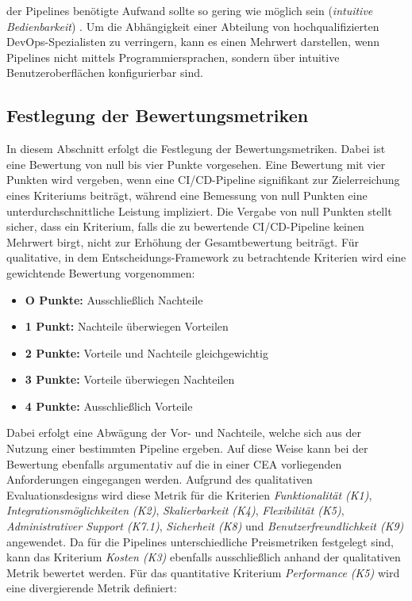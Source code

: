 der Pipelines benötigte Aufwand sollte so gering wie möglich sein (\textit{intuitive Bedienbarkeit}) \cite[Z. 67 ff.]{ProductOwnerSAPBTPProd&Infra.}. Um die Abhängigkeit einer Abteilung von hochqualifizierten DevOps-Spezialisten zu verringern, kann es
einen Mehrwert darstellen, wenn Pipelines nicht mittels Programmiersprachen, sondern über intuitive Benutzeroberflächen konfigurierbar sind. 
\subsection{Festlegung der Bewertungsmetriken}
\label{sec:Metriken}
In diesem Abschnitt erfolgt die Festlegung der Bewertungsmetriken. Dabei ist eine Bewertung von null bis vier Punkte vorgesehen. Eine Bewertung mit vier Punkten wird vergeben, wenn eine CI/CD-Pipeline signifikant zur Zielerreichung eines Kriteriums beiträgt, während eine Bemessung von null Punkten eine unterdurchschnittliche Leistung impliziert. Die Vergabe von null Punkten stellt sicher, dass ein Kriterium, falls die zu bewertende CI/CD-Pipeline keinen Mehrwert birgt, nicht zur Erhöhung der Gesamtbewertung beiträgt. 
Für qualitative, in dem Entscheidungs-Framework zu betrachtende Kriterien wird eine gewichtende Bewertung vorgenommen:
\begin{itemize}
	\setlength{\itemsep}{0pt}
	\item \textbf{O Punkte:} Ausschließlich Nachteile 
	\item \textbf{1 Punkt:} Nachteile überwiegen Vorteilen
	\item \textbf{2 Punkte:} Vorteile und Nachteile gleichgewichtig
	\item \textbf{3 Punkte:} Vorteile überwiegen Nachteilen
	\item \textbf{4 Punkte:} Ausschließlich Vorteile
  \end{itemize}
Dabei erfolgt eine Abwägung der Vor- und Nachteile, welche sich aus der Nutzung einer bestimmten Pipeline ergeben. Auf diese Weise kann bei der Bewertung ebenfalls argumentativ auf die in einer CEA vorliegenden Anforderungen eingegangen werden. Aufgrund des qualitativen Evaluationsdesigns wird diese Metrik für die Kriterien \textit{Funktionalität (K1)}, \textit{Integrationsmöglichkeiten (K2)}, \textit{Skalierbarkeit (K4)}, \textit{Flexibilität (K5)}, \textit{Administrativer Support (K7.1)}, \textit{Sicherheit (K8)} und \textit{Benutzerfreundlichkeit (K9)} angewendet. Da für die Pipelines unterschiedliche  Preismetriken festgelegt sind, kann das Kriterium \textit{Kosten (K3)} ebenfalls ausschließlich anhand der qualitativen Metrik bewertet werden. Für das quantitative Kriterium \textit{Performance (K5)} wird eine divergierende Metrik definiert:
